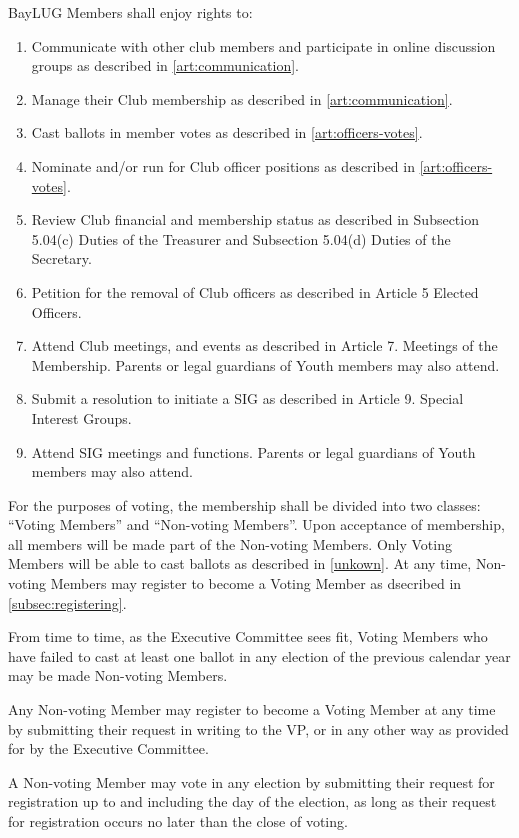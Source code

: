 \documentclass{bylaws}
\begin{document}
BayLUG Members shall enjoy rights to: 
\begin{enumerate}
    \item Communicate with other club members and participate in online discussion groups as described in \ref{art:communication}. 
    \item Manage their Club membership as described in \ref{art:communication}. 
    \item Cast ballots in member votes as described in \ref{art:officers-votes}. 
    \item Nominate and/or run for Club officer positions as described in \ref{art:officers-votes}. 
    \item Review Club financial and membership status as described in Subsection 5.04(c) Duties of the Treasurer and Subsection 5.04(d) Duties of the Secretary. 
    \item Petition for the removal of Club officers as described in Article 5 Elected Officers. 
    \item Attend Club meetings, and events as described in Article 7. Meetings of the Membership. Parents or legal guardians of Youth members may also attend. 
    \item Submit a resolution to initiate a SIG as described in Article 9. Special Interest Groups. 
    \item Attend SIG meetings and functions. Parents or legal guardians of Youth members may also attend. 
\end{enumerate}

For the purposes of voting, the membership shall be divided into two classes:  ``Voting Members'' and  ``Non-voting Members''.  Upon acceptance of membership, all members will be made part of the Non-voting Members.  Only Voting Members will be able to cast ballots as described in \ref{unkown}.  At any time, Non-voting Members may register to become a Voting Member as dsecribed in \ref{subsec:registering}.

From time to time, as the Executive Committee sees fit, Voting Members who have failed to cast at least one ballot in any election of the previous calendar year may be made Non-voting Members.  

\label{subsec:registering}
Any Non-voting Member may register to become a Voting Member at any time by submitting their request in writing to the VP, or in any other way as provided for by the Executive Committee.

A Non-voting Member may vote in any election by submitting their request for registration up to and including the day of the election, as long as their request for registration occurs no later than the close of voting.
\end{document}
